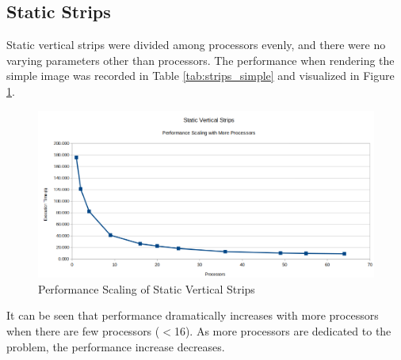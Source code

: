 \documentclass[11pt]{article}
\begin{document}
		
	\subsection{Static Strips}
		
		Static vertical strips were divided among processors evenly, and there were no varying parameters other than processors. The performance when rendering the simple image was recorded in Table \ref{tab:strips_simple} and visualized in Figure \ref{fig:static-strips}.
		
		\begin{figure}[H]
			\centering
			\includegraphics[width=0.7\linewidth]{"Pictures/Static Strips"}
			\caption{Performance Scaling of Static Vertical Strips}
			\label{fig:static-strips}
		\end{figure}
	
		It can be seen that performance dramatically increases with more processors when there are few processors ($<$16). As more processors are dedicated to the problem, the performance increase decreases.
		
\end{document}
